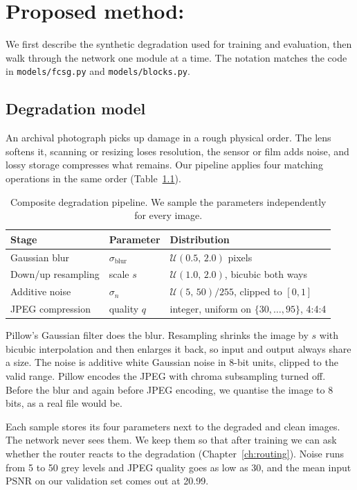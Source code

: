 \chapter{Proposed method: \fcsg}\label{ch:method}

We first describe the synthetic degradation used for training and
evaluation, then walk through the network one module at a time. The notation
matches the code in \texttt{models/fcsg.py} and \texttt{models/blocks.py}.

\section{Degradation model}\label{sec:degradation}

An archival photograph picks up damage in a rough physical order. The lens
softens it, scanning or resizing loses resolution, the sensor or film adds
noise, and lossy storage compresses what remains. Our pipeline applies four
matching operations in the same order (Table~\ref{tab:degradation}).
\begin{table}[htbp]
	\centering
	\caption{Composite degradation pipeline. We sample the parameters independently for every image.}
	\label{tab:degradation}
	\begin{tabular}{@{}lll@{}}
		\toprule
		Stage & Parameter & Distribution \\
		\midrule
		Gaussian blur        & $\sigma_\text{blur}$ & $\mathcal{U}(0.5,\, 2.0)$ pixels \\
		Down/up resampling   & scale $s$            & $\mathcal{U}(1.0,\, 2.0)$, bicubic both ways \\
		Additive noise       & $\sigma_n$           & $\mathcal{U}(5,\, 50)/255$, clipped to $[0,1]$ \\
		JPEG compression     & quality $q$          & integer, uniform on $\{30,\dots,95\}$, 4:4:4 \\
		\bottomrule
	\end{tabular}
\end{table}

Pillow's Gaussian filter does the blur. Resampling shrinks the image by $s$
with bicubic interpolation and then enlarges it back, so input and output
always share a size. The noise is additive white Gaussian noise in 8-bit
units, clipped to the valid range. Pillow encodes the JPEG with chroma
subsampling turned off. Before the blur and again before JPEG encoding, we
quantise the image to 8 bits, as a real file would be.

Each sample stores its four parameters next to the degraded and clean
images. The network never sees them. We keep them so that after training we
can ask whether the router reacts to the degradation
(Chapter~\ref{ch:routing}). Noise runs from 5 to 50 grey levels and JPEG
quality goes as low as 30, and the mean input PSNR on our validation set
comes out at 20.99\dB{}.

